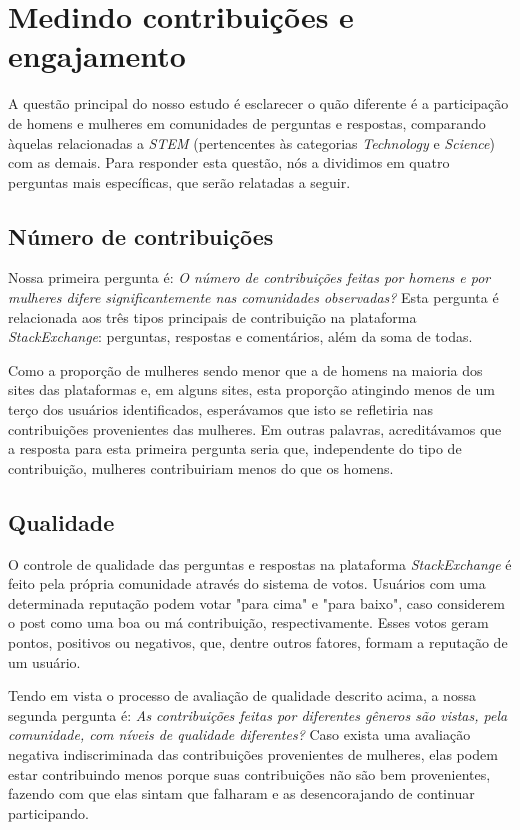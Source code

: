 \section{Medindo contribuições e engajamento}

A questão principal do nosso estudo é esclarecer o quão diferente é a participação de homens e mulheres em comunidades de perguntas e respostas, comparando àquelas relacionadas a \emph{STEM} (pertencentes às categorias \emph{Technology} e \emph{Science}) com as demais. Para responder esta questão, nós a dividimos em quatro perguntas mais específicas, que serão relatadas a seguir.

\subsection{Número de contribuições}

Nossa primeira pergunta é: \textit{O número de contribuições feitas por homens e por mulheres difere significantemente nas comunidades observadas?} Esta pergunta é relacionada aos três tipos principais de contribuição na plataforma \emph{StackExchange}: perguntas, respostas e comentários, além da soma de todas.

Como a proporção de mulheres sendo menor que a de homens na maioria dos sites das plataformas e, em alguns sites, esta proporção atingindo menos de um terço dos usuários identificados, esperávamos que isto se refletiria nas contribuições provenientes das mulheres. Em outras palavras, acreditávamos que a resposta para esta primeira pergunta seria que, independente do tipo de contribuição, mulheres contribuiriam menos do que os homens.

\subsection{Qualidade}

O controle de qualidade das perguntas e respostas na plataforma \emph{StackExchange} é feito pela própria comunidade através do sistema de votos. Usuários com uma determinada reputação podem votar "para cima" e "para baixo", caso considerem o post como uma boa ou má contribuição, respectivamente. Esses votos geram pontos, positivos ou negativos, que, dentre outros fatores, formam a reputação de um usuário. 

Tendo em vista o processo de avaliação de qualidade descrito acima, a nossa segunda pergunta é: \textit{As contribuições feitas por diferentes gêneros são vistas, pela comunidade, com níveis de qualidade diferentes?} Caso exista uma avaliação negativa indiscriminada das contribuições provenientes de mulheres, elas podem estar contribuindo menos porque suas contribuições não são bem provenientes, fazendo com que elas sintam que falharam e as desencorajando de continuar participando. 

